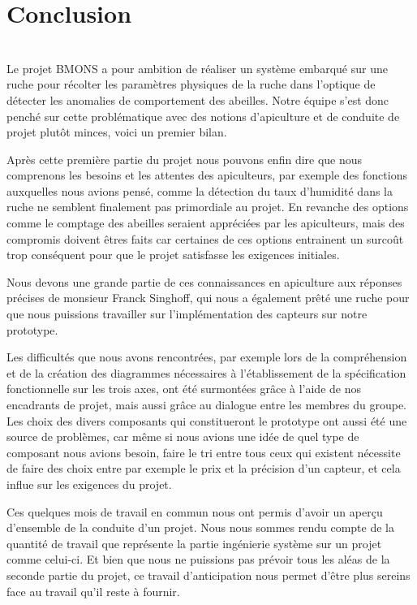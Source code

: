 \chapter{Conclusion}\\
Le projet BMONS a pour ambition de réaliser un système embarqué sur une ruche pour récolter les paramètres physiques de la ruche dans l’optique de détecter les anomalies de comportement des abeilles. Notre équipe s’est donc penché sur cette problématique avec des notions d’apiculture et de conduite de projet plutôt minces, voici un premier bilan.

Après cette première partie du projet nous pouvons enfin dire que nous comprenons les besoins et les attentes des apiculteurs, par exemple des fonctions auxquelles nous avions pensé, comme la détection du taux d'humidité dans la ruche ne semblent finalement pas primordiale au projet. En revanche des options comme le comptage des abeilles seraient appréciées par les apiculteurs, mais des compromis doivent êtres faits car certaines de ces options entrainent un surcoût trop conséquent pour que le projet satisfasse les exigences initiales.\newline 

Nous devons une grande partie de ces connaissances en apiculture aux réponses précises de monsieur Franck Singhoff, qui nous a également prêté une ruche pour que nous puissions travailler sur l'implémentation des capteurs sur notre prototype. \newline 

Les difficultés que nous avons rencontrées, par exemple lors de la compréhension et de la création des diagrammes nécessaires à l’établissement de la spécification fonctionnelle sur les trois axes, ont été surmontées grâce à l’aide de nos encadrants de projet, mais aussi grâce au dialogue entre les membres du groupe. Les choix des divers composants qui constitueront le prototype ont aussi été une source de problèmes, car même si nous avions une idée de quel type de composant nous avions besoin, faire le tri entre tous ceux qui existent nécessite de faire des choix entre par exemple le prix et la précision d’un capteur, et cela influe sur les exigences du projet. \newline

Ces quelques mois de travail en commun nous ont permis d'avoir un aperçu d'ensemble de la conduite d'un projet. Nous nous sommes rendu compte de la quantité de travail que représente la partie ingénierie système sur un projet comme celui-ci. Et bien que nous ne puissions pas prévoir tous les aléas de la seconde partie du projet, ce travail d'anticipation nous permet d'être plus sereins face au travail qu'il reste à fournir.\newline​


